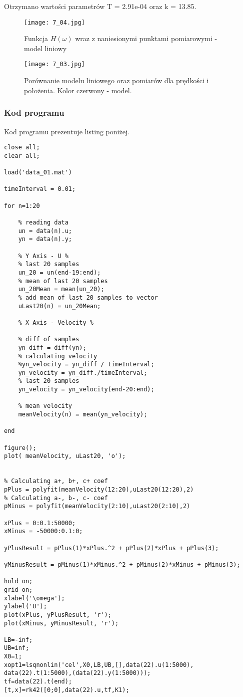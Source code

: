 \documentclass[a4paper,15pt]{article}
\begin{document}
Otrzymano wartości parametrów T = 2.91e-04 oraz k = 13.85.
\begin{figure}[H]
\centerline{\texttt{[image: 7\_04.jpg]}}
\centering
\caption{Funkcja \( H(\omega) \) wraz z naniesionymi punktami pomiarowymi - model liniowy}
\label{fig:7_04}
\end{figure}

\begin{figure}[H]
\centerline{\texttt{[image: 7\_03.jpg]}}
\centering
\caption{Porównanie modelu liniowego oraz pomiarów dla prędkości i położenia. Kolor czerwony - model.}
\label{fig:7_03}
\end{figure}



\subsubsection{Kod programu}
Kod programu prezentuje listing poniżej.
\begin{lstlisting}[caption=Zadanie 1, captionpos=b,label=lis1, firstnumber=1,frame=single]
close all;
clear all;

load('data_01.mat')

timeInterval = 0.01;

for n=1:20
    
    % reading data
    un = data(n).u;
    yn = data(n).y;
    
    % Y Axis - U %
    % last 20 samples 
    un_20 = un(end-19:end);
    % mean of last 20 samples
    un_20Mean = mean(un_20);
    % add mean of last 20 samples to vector 
    uLast20(n) = un_20Mean; 
    
    % X Axis - Velocity %
    
    % diff of samples
    yn_diff = diff(yn);
    % calculating velocity
    %yn_velocity = yn_diff / timeInterval;
    yn_velocity = yn_diff./timeInterval;
    % last 20 samples 
    yn_velocity = yn_velocity(end-20:end);
    
    % mean velocity 
    meanVelocity(n) = mean(yn_velocity);
    
end

figure();
plot( meanVelocity, uLast20, 'o');


% Calculating a+, b+, c+ coef
pPlus = polyfit(meanVelocity(12:20),uLast20(12:20),2)
% Calculating a-, b-, c- coef
pMinus = polyfit(meanVelocity(2:10),uLast20(2:10),2)

xPlus = 0:0.1:50000;
xMinus = -50000:0.1:0;

yPlusResult = pPlus(1)*xPlus.^2 + pPlus(2)*xPlus + pPlus(3);

yMinusResult = pMinus(1)*xMinus.^2 + pMinus(2)*xMinus + pMinus(3);

hold on;
grid on;
xlabel('\omega');
ylabel('U');
plot(xPlus, yPlusResult, 'r');
plot(xMinus, yMinusResult, 'r');

LB=-inf;
UB=inf;
X0=1;  
xopt1=lsqnonlin('cel',X0,LB,UB,[],data(22).u(1:5000),
data(22).t(1:5000),(data(22).y(1:5000))); 
tf=data(22).t(end); 
[t,x]=rk42([0;0],data(22).u,tf,K1); 
\end{lstlisting}
\end{document}
